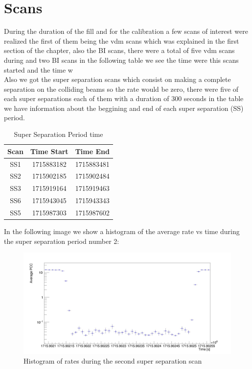 \section{Scans}

During the duration of the fill and for the calibration a few scans of interest were realized the first of them being the vdm scans which was explained in the first section of the chapter, also the BI scans, there were a total of five vdm scans during and two BI scans in the following table we see the time were this scans started and the time w    \\



Also we got the super separation scans which consist on making a complete separation on the colliding beams so the rate would be zero, there were five of each super separations each of them with a duration of 300 seconds in the table we have information about the beggining and end of each super separation (SS) period. 

\begin{table} [H]
\begin{center}
\caption{Super Separation Period time}
\begin{tabular}{|c c c|} 
 \hline
 Scan & Time Start & Time End  \\ [0.5ex] 
 \hline\hline
 SS1 & 1715883182 & 1715883481  \\ 
 \hline
 SS2 & 1715902185 & 1715902484  \\
 \hline
 SS3 & 1715919164 & 1715919463 \\
 \hline
 SS6 & 1715943045 & 1715943343  \\
 \hline
 SS5 & 1715987303 & 1715987602  \\ [1.0ex]
 \hline
\end{tabular}
\end{center}
\end{table}

In the following image we show a histogram of the average rate vs time during the super separation period number 2: 

\begin{figure}[h]
    \centering
    \includegraphics[width=1\textwidth]{SS1.jpeg}
    \caption{Histogram of rates during the second super separation scan}
    \label{fig:SS1}
\end{figure}

